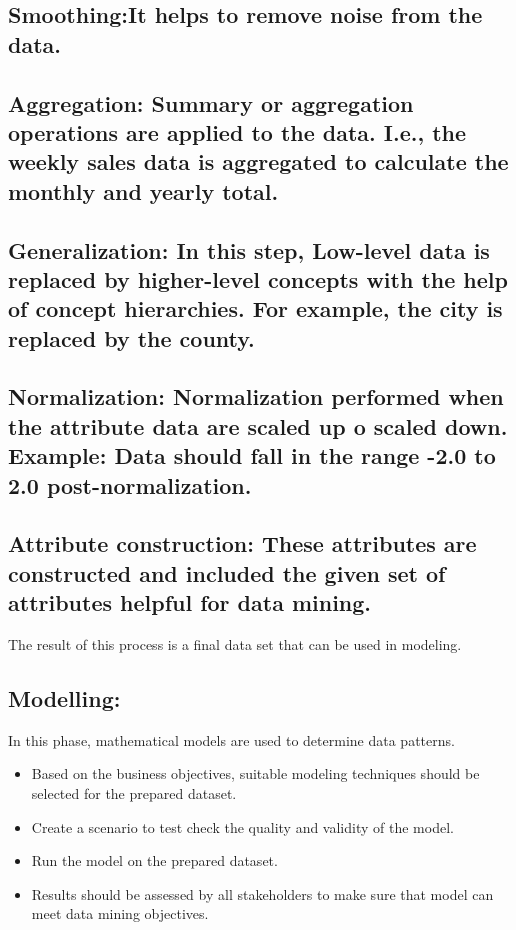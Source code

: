 \documentclass[a4paper,10pt]{article}
\begin{document}
\subsection*{Smoothing:It helps to remove noise from the data.}
\subsection*{Aggregation: \small Summary or aggregation operations are applied to the data. I.e., the weekly sales data is aggregated to calculate the monthly and yearly total.}
\subsection*{Generalization: \small In this step, Low-level data is replaced by higher-level concepts with the help of concept hierarchies. For example, the city is replaced by the county.}
\subsection*{Normalization: \small Normalization performed when the attribute data are scaled up o scaled down. Example: Data should fall in the range -2.0 to 2.0 post-normalization.}
\subsection*{Attribute construction: \small These attributes are constructed and included the given set of attributes helpful for data mining.}

The result of this process is a final data set that can be used in modeling.

\subsection{Modelling:}
In this phase, mathematical models are used to determine data patterns.
\begin{itemize}
	\item Based on the business objectives, suitable modeling techniques should be selected for the prepared dataset.
	\item Create a scenario to test check the quality and validity of the model.
	\item Run the model on the prepared dataset.
	\item Results should be assessed by all stakeholders to make sure that model can meet data mining objectives.
\end{itemize}
\end{document}
